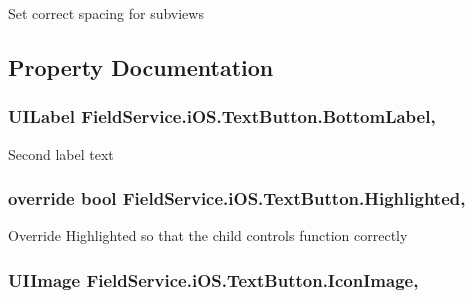 Set correct spacing for subviews 



\subsection{Property Documentation}
\hypertarget{class_field_service_1_1i_o_s_1_1_text_button_afc8f9bf0a4b798c479a3d2c04eb1e318}{
\subsubsection[{Bottom\+Label}]{\setlength{\rightskip}{0pt plus 5cm}U\+I\+Label Field\+Service.\+i\+O\+S.\+Text\+Button.\+Bottom\+Label\hspace{0.3cm}{\ttfamily [get]}, {\ttfamily [set]}}}\label{class_field_service_1_1i_o_s_1_1_text_button_afc8f9bf0a4b798c479a3d2c04eb1e318}


Second label text 

\hypertarget{class_field_service_1_1i_o_s_1_1_text_button_af2894452cd8de117f53b7a155de9f731}{
\subsubsection[{Highlighted}]{\setlength{\rightskip}{0pt plus 5cm}override bool Field\+Service.\+i\+O\+S.\+Text\+Button.\+Highlighted\hspace{0.3cm}{\ttfamily [get]}, {\ttfamily [set]}}}\label{class_field_service_1_1i_o_s_1_1_text_button_af2894452cd8de117f53b7a155de9f731}


Override Highlighted so that the child controls function correctly 

\hypertarget{class_field_service_1_1i_o_s_1_1_text_button_a7647daf80507478a6a0d7b07c3d0bde4}{
\subsubsection[{Icon\+Image}]{\setlength{\rightskip}{0pt plus 5cm}U\+I\+Image Field\+Service.\+i\+O\+S.\+Text\+Button.\+Icon\+Image\hspace{0.3cm}{\ttfamily [get]}, {\ttfamily [set]}}}\label{class_field_service_1_1i_o_s_1_1_text_button_a7647daf80507478a6a0d7b07c3d0bde4}


